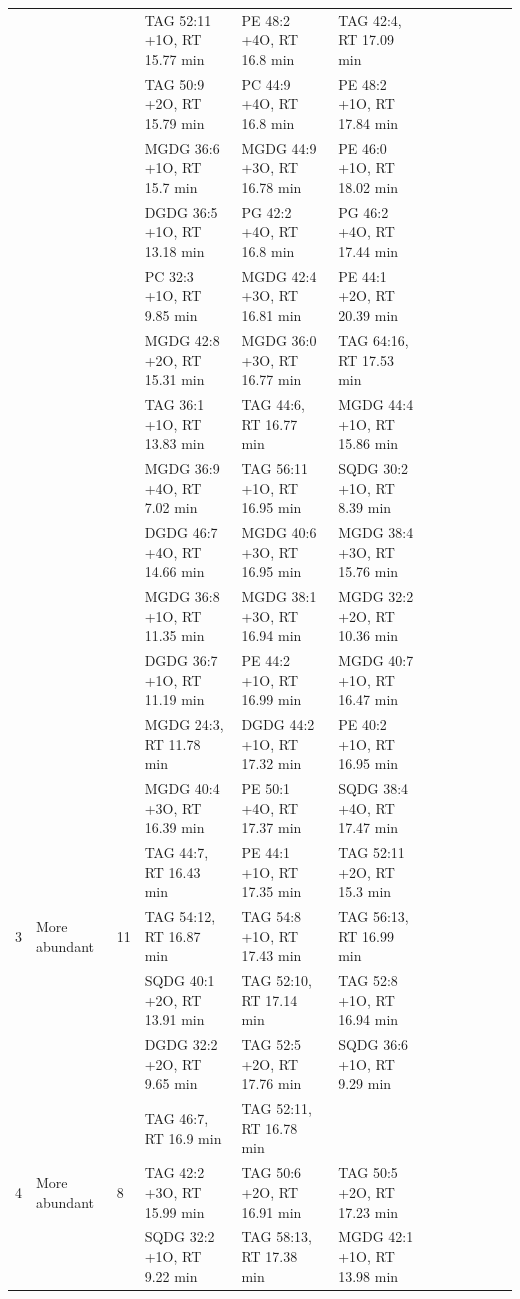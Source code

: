 \begin{landscape}
\begin{footnotesize}
\begin{singlespace}
\begin{flushleft}
\begin{longtable}{ Lp{.03\linewidth} Lp{.12\linewidth} Lp{.03\linewidth} Lp{.24\linewidth} Lp{.24\linewidth} Lp{.24\linewidth} }
 &  &  & TAG 52:11 +1O, RT 15.77 min & PE 48:2 +4O, RT 16.8 min & TAG 42:4, RT 17.09 min \\
 &  &  & TAG 50:9 +2O, RT 15.79 min & PC 44:9 +4O, RT 16.8 min & PE 48:2 +1O, RT 17.84 min \\
 &  &  & MGDG 36:6 +1O, RT 15.7 min & MGDG 44:9 +3O, RT 16.78 min & PE 46:0 +1O, RT 18.02 min \\
 &  &  & DGDG 36:5 +1O, RT 13.18 min & PG 42:2 +4O, RT 16.8 min & PG 46:2 +4O, RT 17.44 min \\
 &  &  & PC 32:3 +1O, RT 9.85 min & MGDG 42:4 +3O, RT 16.81 min & PE 44:1 +2O, RT 20.39 min \\
 &  &  & MGDG 42:8 +2O, RT 15.31 min & MGDG 36:0 +3O, RT 16.77 min & TAG 64:16, RT 17.53 min \\
 &  &  & TAG 36:1 +1O, RT 13.83 min & TAG 44:6, RT 16.77 min & MGDG 44:4 +1O, RT 15.86 min \\
 &  &  & MGDG 36:9 +4O, RT 7.02 min & TAG 56:11 +1O, RT 16.95 min & SQDG 30:2 +1O, RT 8.39 min \\
 &  &  & DGDG 46:7 +4O, RT 14.66 min & MGDG 40:6 +3O, RT 16.95 min & MGDG 38:4 +3O, RT 15.76 min \\
 &  &  & MGDG 36:8 +1O, RT 11.35 min & MGDG 38:1 +3O, RT 16.94 min & MGDG 32:2 +2O, RT 10.36 min \\
 &  &  & DGDG 36:7 +1O, RT 11.19 min & PE 44:2 +1O, RT 16.99 min & MGDG 40:7 +1O, RT 16.47 min \\
 &  &  & MGDG 24:3, RT 11.78 min & DGDG 44:2 +1O, RT 17.32 min & PE 40:2 +1O, RT 16.95 min \\
 &  &  & MGDG 40:4 +3O, RT 16.39 min & PE 50:1 +4O, RT 17.37 min & SQDG 38:4 +4O, RT 17.47 min \\
 &  &  & TAG 44:7, RT 16.43 min & PE 44:1 +1O, RT 17.35 min & TAG 52:11 +2O, RT 15.3 min \\
3 & More abundant & 11 & TAG 54:12, RT 16.87 min & TAG 54:8 +1O, RT 17.43 min & TAG 56:13, RT 16.99 min \\
 &  &  & SQDG 40:1 +2O, RT 13.91 min & TAG 52:10, RT 17.14 min & TAG 52:8 +1O, RT 16.94 min \\
 &  &  & DGDG 32:2 +2O, RT 9.65 min & TAG 52:5 +2O, RT 17.76 min & SQDG 36:6 +1O, RT 9.29 min \\
 &  &  & TAG 46:7, RT 16.9 min & TAG 52:11, RT 16.78 min &  \\
4 & More abundant & 8 & TAG 42:2 +3O, RT 15.99 min & TAG 50:6 +2O, RT 16.91 min & TAG 50:5 +2O, RT 17.23 min \\
 &  &  & SQDG 32:2 +1O, RT 9.22 min & TAG 58:13, RT 17.38 min & MGDG 42:1 +1O, RT 13.98 min \\

\end{longtable}
\end{flushleft}
\end{singlespace}
\end{footnotesize}
\end{landscape}
